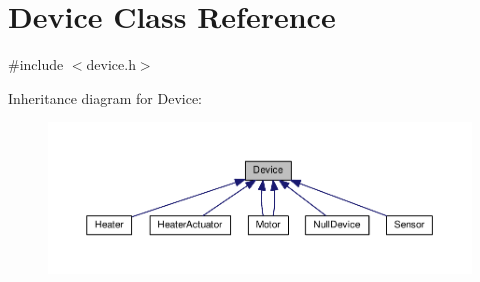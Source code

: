 \hypertarget{class_device}{}\section{Device Class Reference}
\label{class_device}


{\ttfamily \#include $<$device.\+h$>$}



Inheritance diagram for Device\+:
\nopagebreak
\begin{figure}[H]
\begin{center}
\leavevmode
\includegraphics[width=350pt]{class_device__inherit__graph}
\end{center}
\end{figure}
